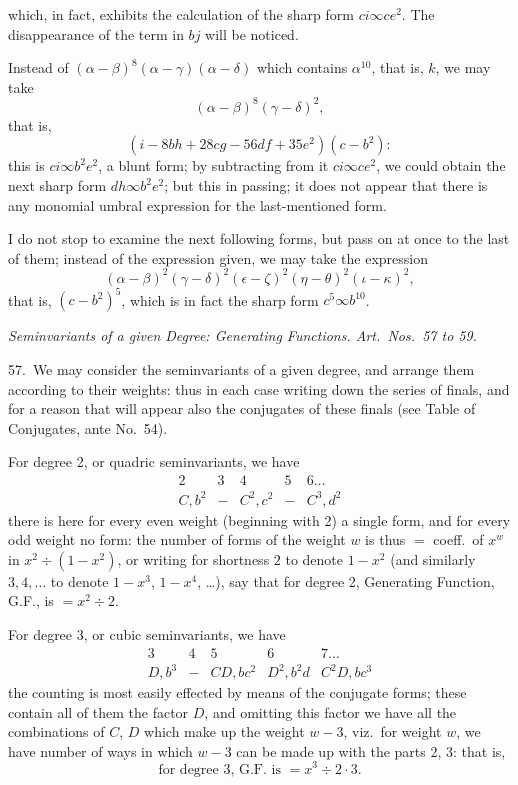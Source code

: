 \documentclass[11pt]{article}
\begin{document}
\medskip
which, in fact, exhibits the calculation of the sharp form $ci \infty ce^2$. The disappearance of the term in $bj$ will be noticed.

\clearpage
Instead of $(\alpha - \beta)^8 (\alpha - \gamma)(\alpha - \delta)$ which contains $\alpha^{10}$, that is, $k$, we may take
\[
(\alpha - \beta)^8 (\gamma - \delta)^2,
\]
that is,
\[
(i - 8bh + 28cg - 56df + 35e^2)(c - b^2):
\]
this is $ci \infty b^2e^2$, a blunt form; by subtracting from it $ci \infty ce^2$, we could obtain the next sharp form $dh \infty b^2e^2$; but this in passing; it does not appear that there is any monomial umbral expression for the last-mentioned form.

I do not stop to examine the next following forms, but pass on at once to the last of them; instead of the expression given, we may take the expression
\[
(\alpha - \beta)^2 (\gamma - \delta)^2 (\epsilon - \zeta)^2 (\eta - \theta)^2 (\iota - \kappa)^2,
\]
that is, $(c - b^2)^5$, which is in fact the sharp form $c^5 \infty b^{10}$.

\medskip
\begin{center}
\textit{Seminvariants of a given Degree: Generating Functions. Art.\ Nos.\ 57 to 59.}
\end{center}

57.\ We may consider the seminvariants of a given degree, and arrange them according to their weights: thus in each case writing down the series of finals, and for a reason that will appear also the conjugates of these finals (see Table of Conjugates, ante No.\ 54).

For degree 2, or quadric seminvariants, we have
\[
\begin{array}{ccccc}
2 & 3 & 4 & 5 & 6 \ldots \\
\hline
C, b^2 & - & C^2, c^2 & - & C^3, d^2
\end{array}
\]
there is here for every even weight (beginning with 2) a single form, and for every odd weight no form: the number of forms of the weight $w$ is thus $= $ coeff.\ of $x^w$ in $x^2 \div (1 - x^2)$, or writing for shortness $2$ to denote $1 - x^2$ (and similarly $3, 4, \ldots$ to denote $1 - x^3$, $1 - x^4$, \ldots), say that for degree 2, Generating Function, G.F., is $= x^2 \div 2$.

For degree 3, or cubic seminvariants, we have
\[
\begin{array}{ccccc}
3 & 4 & 5 & 6 & 7 \ldots \\
\hline
D, b^3 & - & CD, bc^2 & D^2, b^2d & C^2D, bc^3
\end{array}
\]
the counting is most easily effected by means of the conjugate forms; these contain all of them the factor $D$, and omitting this factor we have all the combinations of $C$, $D$ which make up the weight $w - 3$, viz.\ for weight $w$, we have number of ways in which $w - 3$ can be made up with the parts 2, 3: that is,
\[
\text{for degree 3, G.F.\ is } = x^3 \div 2 \cdot 3.
\]
\end{document}
